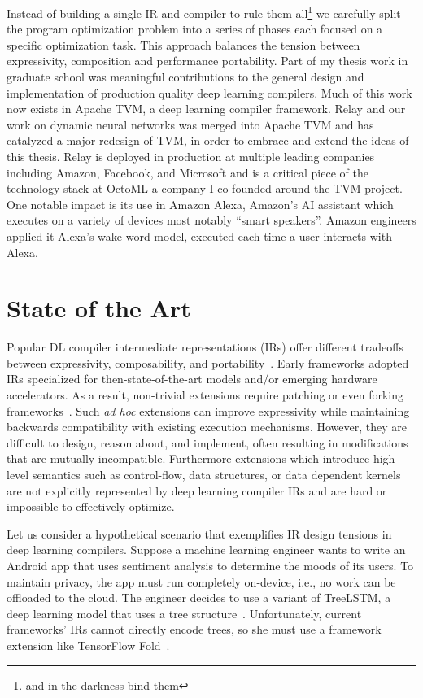 Instead of building a single IR and compiler to rule them all\footnote{and in the darkness bind them}
  we carefully split the program optimization problem into a series of
  phases each focused on a specific optimization task.
This approach balances the tension between expressivity, composition
  and performance portability.
Part of my thesis work in graduate school
  was meaningful contributions to the general design and implementation of
  production quality deep learning compilers.
Much of this work now exists in Apache TVM, a deep learning compiler framework.
Relay and our work on dynamic neural networks was merged into Apache TVM and
  has catalyzed a major redesign of TVM, in order to embrace and extend the ideas of this thesis.
Relay is deployed in production at multiple leading companies including
  Amazon, Facebook, and Microsoft and is a critical piece of the technology stack
  at OctoML a company I co-founded around the TVM project.
One notable impact is its use in Amazon Alexa, Amazon's AI assistant
  which executes on a variety of devices most notably ``smart speakers''.
Amazon engineers applied it Alexa’s wake word model, executed each time a user interacts with
  Alexa.

\section{State of the Art}

Popular DL compiler intermediate representations (IRs) offer different tradeoffs
  between expressivity, composability, and portability~\citep{
    tensorflow, pytorch_ad, chainer_learningsys2015, tangent, theano, glow}.
Early frameworks adopted IRs
  specialized for then-state-of-the-art models and/or
  emerging hardware accelerators.
As a result, non-trivial extensions require
  patching or even forking frameworks~\citep{
    tf_fold, tf_lite, tangent, tf_eager, xla, glow, torchscript}.
Such \textit{ad hoc} extensions can improve expressivity
  while maintaining backwards compatibility with existing execution mechanisms.
However, they are difficult to design, reason about, and implement,
  often resulting in modifications that are mutually incompatible.
Furthermore extensions which introduce high-level semantics
  such as control-flow, data structures, or data dependent kernels
  are not explicitly represented by deep learning compiler IRs
  and are hard or impossible to effectively optimize.

Let us consider a hypothetical scenario that exemplifies
  IR design tensions in deep learning compilers.
Suppose a machine learning engineer wants to write
  an Android app that uses sentiment analysis to
  determine the moods of its users.
To maintain privacy, the app must run completely on-device,
  i.e., no work can be offloaded to the cloud.
The engineer decides to use a variant of TreeLSTM,
  a deep learning model that uses a tree structure~\citep{tree_lstm}.
Unfortunately, current frameworks' IRs cannot directly encode trees,
  so she must use a framework extension
  like TensorFlow Fold~\citep{tensorflowfold}.


